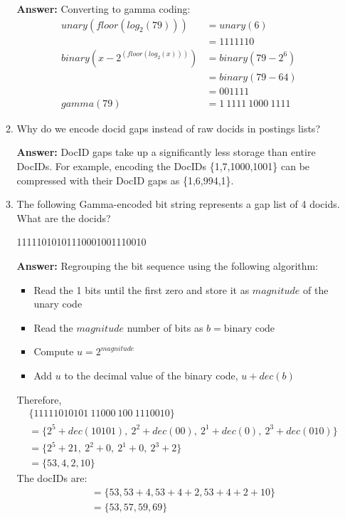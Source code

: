 \documentclass[11pt]{article}
\begin{document}
\begin{enumerate}
\begin{enumerate}
                \textbf{Answer:} Converting to gamma coding:
                \begin{align*}
                  unary(floor(log_2(79)))         & = unary(6)               \\
                                                  & = 1111110                \\
                  binary(x-2^{(floor(log_2(x)))}) & = binary(79 - 2^6)       \\
                                                  & = binary(79 - 64)        \\
                                                  & = 001111                 \\
                  gamma(79)                       & = 1 \ 1111 \ 1000 \ 1111
                \end{align*}


          \item Why do we encode docid gaps instead of raw docids in postings lists?

                \textbf{Answer:} DocID gaps take up a significantly less storage than entire DocIDs. For example, encoding the DocIDs \{1,7,1000,1001\} can be compressed with their DocID gaps as \{1,6,994,1\}.

          \item The following Gamma-encoded bit string represents a gap list of 4 docids. What are the docids?

                11111010101110001001110010

                \textbf{Answer:} Regrouping the bit sequence using the following algorithm:
                \begin{itemize}
                  \item Read the 1 bits until the first zero and store it as $magnitude$ of the unary code
                  \item Read the $magnitude$ number of bits as $b=\text{binary code}$
                  \item Compute $u=2^{magnitude}$
                  \item Add $u$ to the decimal value of the binary code, $u + dec(b)$
                \end{itemize}
                Therefore,
                \begin{align*}
                   & \{111110 10101 \ 110 00 \ 10 0 \ 1110 010 \}                               \\
                   & = \{2^5 + dec(10101), \ 2^2 +  dec(00), \ 2^1 + dec(0), \ 2^3 + dec(010)\} \\
                   & = \{2^5 + 21, \ 2^2 +  0, \ 2^1 + 0, \ 2^3 + 2\}                           \\
                   & = \{53, 4, 2, 10\}
                \end{align*}
                The docIDs are:
                \begin{align*}
                   & = \{53, 53+4, 53+4+2, 53+4+2+10\} \\
                   & = \{53, 57, 59, 69\}
                \end{align*}


\end{enumerate}
\end{enumerate}
\end{document}
